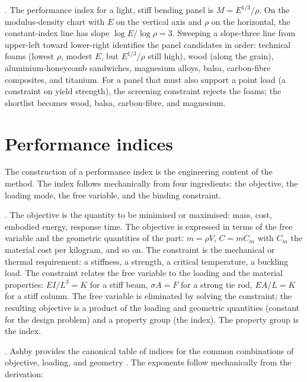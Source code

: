 . The performance index
for a light, stiff bending panel is $M = E^{1/3} / \rho$. On the
modulus-density chart with $E$ on the vertical axis and $\rho$ on the
horizontal, the constant-index line has slope $\log E / \log \rho =
3$. Sweeping a slope-three line from upper-left toward lower-right
identifies the panel candidates in order: technical foams (lowest
$\rho$, modest $E$, but $E^{1/3}/\rho$ still high), wood (along the
grain), aluminium-honeycomb sandwiches, magnesium alloys, balsa,
carbon-fibre composites, and titanium. For a panel that must also
support a point load (a constraint on yield strength), the screening
constraint rejects the foams; the shortlist becomes wood, balsa,
carbon-fibre, and magnesium.

\section{Performance indices}

The construction of a performance index is the engineering content of
the method. The index follows mechanically from four ingredients: the
objective, the loading mode, the free variable, and the binding
constraint.

. The objective is the quantity
to be minimised or maximised: mass, cost, embodied energy, response
time. The objective is expressed in terms of the free variable and
the geometric quantities of the part: $m = \rho V$, $C = m C_m$ with
$C_m$ the material cost per kilogram, and so on. The constraint is
the mechanical or thermal requirement: a stiffness, a strength, a
critical temperature, a buckling load. The constraint relates the
free variable to the loading and the material properties: $E I/L^3 =
K$ for a stiff beam, $\sigma A = F$ for a strong tie rod, $E A/L = K$
for a stiff column. The free variable is eliminated by solving the
constraint; the resulting objective is a product of the loading and
geometric quantities (constant for the design problem) and a property
group (the index). The property group is the index.

. Ashby provides the canonical
table of indices for the common combinations of objective, loading,
and geometry \cite[Appendix B]{text:ashby2017}. The exponents follow
mechanically from the derivation:


